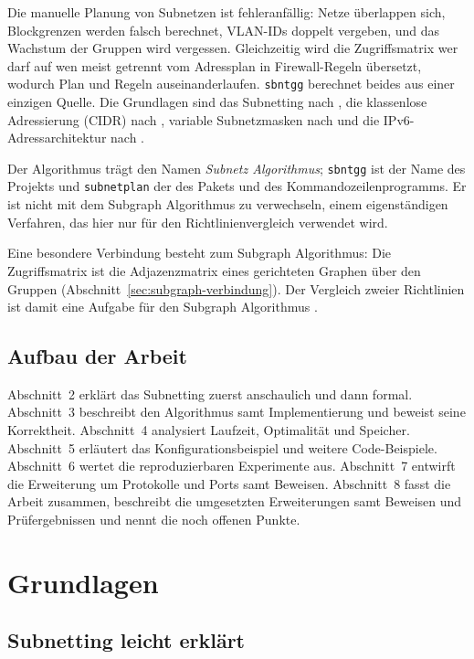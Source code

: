 \documentclass[a4paper,12pt, twoside]{report}
\theoremstyle{definition}
\begin{document}
Die manuelle Planung von Subnetzen ist fehleranfällig: Netze überlappen sich, Blockgrenzen werden falsch berechnet, VLAN-IDs doppelt vergeben, und das Wachstum der Gruppen wird vergessen. Gleichzeitig wird die Zugriffsmatrix \glqq wer darf auf wen\grqq{} meist getrennt vom Adressplan in Firewall-Regeln übersetzt, wodurch Plan und Regeln auseinanderlaufen. \texttt{sbntgg} berechnet beides aus einer einzigen Quelle. Die Grundlagen sind das Subnetting nach \cite{rfc950}, die klassenlose Adressierung (CIDR) nach \cite{rfc4632}, variable Subnetzmasken nach \cite{rfc1878} und die IPv6-Adressarchitektur nach \cite{rfc4291}.

Der Algorithmus trägt den Namen \emph{Subnetz Algorithmus}; \texttt{sbntgg} ist der Name des Projekts und \texttt{subnetplan} der des Pakets und des Kommandozeilenprogramms. Er ist nicht mit dem Subgraph Algorithmus \cite{epp26} zu verwechseln, einem eigenständigen Verfahren, das hier nur für den Richtlinienvergleich verwendet wird.

Eine besondere Verbindung besteht zum Subgraph Algorithmus: Die Zugriffsmatrix ist die Adjazenzmatrix eines gerichteten Graphen über den Gruppen (Abschnitt~\ref{sec:subgraph-verbindung}). Der Vergleich zweier Richtlinien ist damit eine Aufgabe für den Subgraph Algorithmus \cite{epp26}.

\section{Aufbau der Arbeit}

Abschnitt~2 erklärt das Subnetting zuerst anschaulich und dann formal. Abschnitt~3 beschreibt den Algorithmus samt Implementierung und beweist seine Korrektheit. Abschnitt~4 analysiert Laufzeit, Optimalität und Speicher. Abschnitt~5 erläutert das Konfigurationsbeispiel und weitere Code-Beispiele. Abschnitt~6 wertet die reproduzierbaren Experimente aus. Abschnitt~7 entwirft die Erweiterung um Protokolle und Ports samt Beweisen. Abschnitt~8 fasst die Arbeit zusammen, beschreibt die umgesetzten Erweiterungen samt Beweisen und Prüfergebnissen und nennt die noch offenen Punkte.

\chapter{Grundlagen}

\section{Subnetting leicht erklärt}
\label{sec:leicht}
\end{document}
